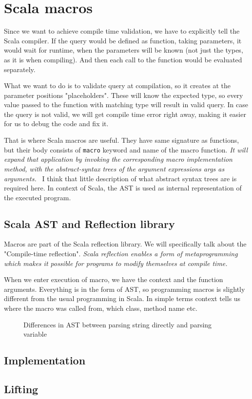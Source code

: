\section{Scala macros}
Since we want to achieve compile time validation, we have to explicitly tell the Scala compiler. If the query would be defined as function, taking parameters, it would wait for runtime, when the parameters will be known (not just the types, as it is when compiling). And then each call to the function would be evaluated separately.

What we want to do is to validate query at compilation, so it creates at the parameter positions "placeholders". These will know the expected type, so every value passed to the function with matching type will result in valid query. In case the query is not valid, we will get compile time error right away, making it easier for us to debug the code and fix it.

That is where Scala macros are useful. They have same signature as functions, but their body consists of \texttt{macro} keyword and name of the macro function.  \textit{It will expand that application by invoking the corresponding macro implementation method, with the abstract-syntax trees of the argument expressions args as arguments.}~\cite{Def macros} I think that little description of what abstract syntax trees are is required here. In context of Scala, the AST is used as internal representation of the executed program. 

\subsection{Scala AST and Reflection library}
Macros are part of the Scala reflection library. We will specifically talk about the "Compile-time reflection". \textit{Scala reflection enables a form of metaprogramming which makes it possible for programs to modify themselves at compile time.}\cite{Compile-time reflection} 

When we enter execution of macro, we have the context and the function arguments. Everything is in the form of AST, so programming macros is slightly different from the usual programming in Scala. In simple terms context tells us where the macro was called from, which class, method name etc. 

\begin{figure}[h]
  \caption {Differences in AST between parsing string directly and parsing variable}
\end{figure}

\subsection{Implementation}

\subsection{Lifting}

